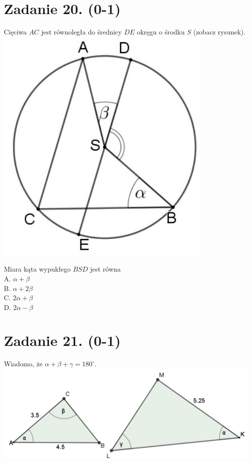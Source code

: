 \documentclass[10pt]{article}
\begin{document}
\section*{Zadanie 20. (0-1)}
Cięciwa \(A C\) jest równoległa do średnicy \(D E\) okręgu o środku \(S\) (zobacz rysunek).\\
\includegraphics[max width=\textwidth, center]{2024_11_21_ba65d61981011633d840g-08(1)}

Miara kąta wypukłego \(B S D\) jest równa\\
A. \(\alpha+\beta\)\\
B. \(\alpha+2 \beta\)\\
C. \(2 \alpha+\beta\)\\
D. \(2 \alpha-\beta\)

\section*{Zadanie 21. (0-1)}
Wiadomo, że \(\alpha+\beta+\gamma=180^{\circ}\).\\
\includegraphics[max width=\textwidth, center]{2024_11_21_ba65d61981011633d840g-08}
\end{document}
